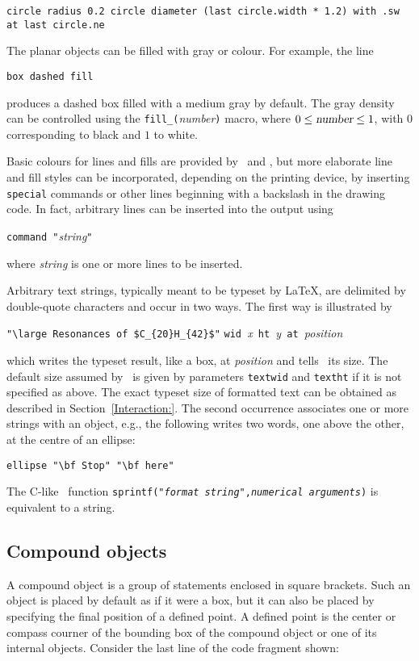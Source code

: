 {\tt circle radius 0.2\hfill\break 
\hspace*{\parindent}%
circle diameter (last circle.width * 1.2) with .sw at last circle.ne}

The planar objects can be filled with gray or colour. For example, the line

{\tt box dashed fill}

\noindent produces a dashed box filled with a medium gray by default.
The gray density can be controlled using the \verb|fill_(|{\sl number}\verb|)|
macro, where $0\leq \hbox{\sl number}\leq 1$, with $0$ corresponding to
black and $1$ to white. 

Basic colours for lines and fills are provided by \gpic\  and \dpic,
but more elaborate line and fill styles can be incorporated, depending
on the printing device, by inserting {\tt {} special} commands or
other lines beginning with a backslash in the drawing code.  In fact,
arbitrary lines can be inserted into the output using

{\tt command "}{\sl string}{\tt "}

\noindent where {\sl string} is one or more lines to be inserted.

Arbitrary text strings, typically meant to be typeset by \LaTeX, are
delimited by double-quote characters and occur in two ways.  The first
way is illustrated by

\verb|"\large Resonances of $C_{20}H_{42}$"|
 \verb|wid |{\sl x}\verb| ht |{\sl y}\verb| at |{\sl position}

\noindent
which writes the typeset result, like a box, at {\sl position} and tells
\pic\ its size.  The default size assumed by \pic\ is given by parameters
{\tt textwid} and {\tt textht} if it is not specified as above.
The exact typeset size of formatted text can be obtained
as described in Section~\ref{Interaction:}.  The second occurrence
associates one or more strings with an object, e.g., the following writes
two words, one above the other, at the centre of an ellipse:

\verb|ellipse "\bf Stop" "\bf here"|

\noindent
The C-like \pic\ function
 {\tt sprintf("{\sl format string}",{\sl numerical arguments})}
is equivalent to a string.

\subsection{Compound objects}\label{Compound}
A compound object is a group of statements enclosed in square
brackets.  Such an object is placed by default as if it were a box, but
it can also be placed by specifying the final position of a defined point.
A defined point is the center or compass courner of the bounding box
of the compound object or one of its internal objects.
Consider the last line of the code fragment shown:


